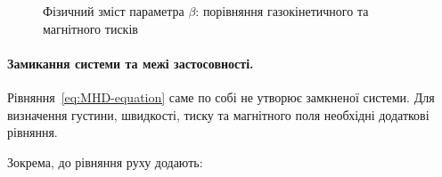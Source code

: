 \begin{figure}[h!]
    \centering
    \caption{Фізичний зміст параметра $\beta$: порівняння газокінетичного та магнітного
    тисків}
    \label{pic:plasma-beta}
\end{figure}



\paragraph{Замикання системи та межі застосовності.}



Рівняння~\eqref{eq:MHD-equation} саме по собі не утворює замкненої системи. Для визначення
густини, швидкості, тиску та магнітного поля необхідні додаткові рівняння.

Зокрема, до рівняння руху додають:

